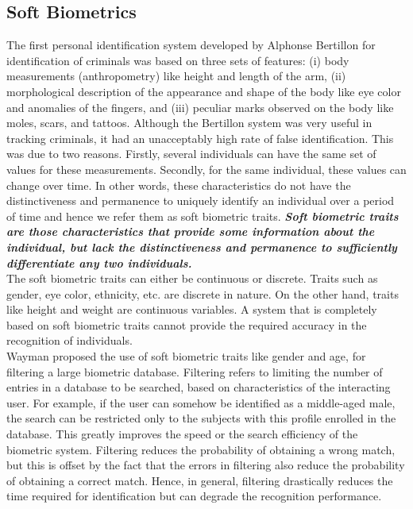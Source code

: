 \documentclass[12pt]{report}			%
\begin{document}
\subsection{ Soft Biometrics }
The first personal identification system developed by Alphonse Bertillon\cite{bert96} for identification of criminals was based on three sets of features: (i) body measurements (anthropometry) like height and length of the arm, (ii) morphological description of the appearance and shape of the body like eye color and anomalies of the fingers, and (iii) peculiar marks observed on the body like moles, scars, and tattoos. Although the Bertillon system was very useful in tracking criminals, it had an unacceptably high rate of false identification. This was due to two reasons. Firstly, several individuals can have the same set of values for these measurements. Secondly, for the same individual, these values can change over time. In other words, these characteristics do not have the distinctiveness and permanence to uniquely identify an individual over a period of time and hence we refer them as soft biometric traits. {\bf \it Soft biometric traits are those
characteristics that provide some information about the individual, but lack the distinctiveness and permanence to sufficiently differentiate any two individuals.}\cite{Jain204}\\
The soft biometric traits can either be continuous or discrete. Traits such as gender, eye color, ethnicity, etc. are discrete in nature. On the other hand, traits like height and weight are continuous variables. A system that is completely based on soft biometric traits cannot provide the required accuracy in the recognition of individuals.\\
Wayman\cite{way97} proposed the use of soft biometric traits like gender and age, for filtering a large biometric database. Filtering refers to limiting the number of entries in a database to be searched, based on characteristics of the interacting user. For example, if the user can somehow be identified as a middle-aged male, the search can be restricted only to the subjects with this profile enrolled in the database. This greatly improves the speed or the search efficiency of the biometric system. Filtering reduces the probability of obtaining a wrong match, but this is offset by the fact that the errors in filtering also reduce the probability of obtaining a correct match. Hence, in general, filtering drastically reduces the time required for identification but can degrade the recognition performance.
\end{document}
